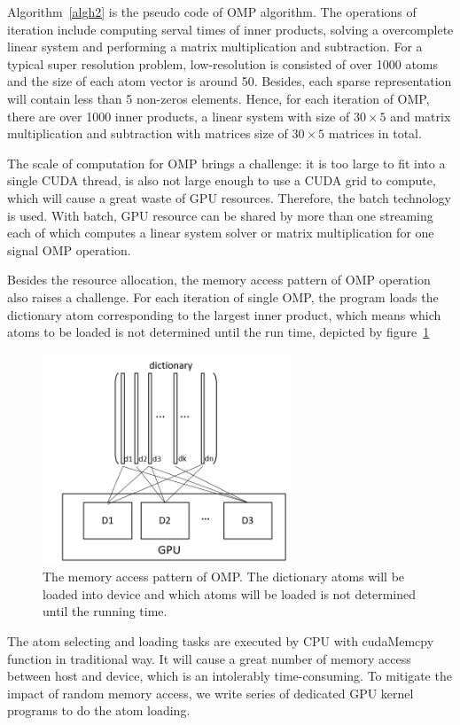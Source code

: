 \documentclass[english]{cccconf}
\begin{document}
Algorithm~\ref{algh2} is the pseudo code of OMP algorithm. The operations of iteration include computing serval times of inner products, solving a overcomplete linear system and performing a matrix multiplication and subtraction. For a typical super resolution problem, low-resolution is consisted of over 1000 atoms and the size of each atom vector is around 50. Besides, each sparse representation will contain less than 5 non-zeros elements. Hence, for each iteration of OMP, there are over 1000 inner products, a linear system with size of \(30 \times 5\) and matrix multiplication and subtraction with matrices size of \(30 \times 5\) matrices in total.

The scale of computation for OMP brings a challenge: it is too large to fit into a single CUDA thread, is also not large enough to use a CUDA grid to compute, which will cause a great waste of GPU resources. Therefore, the batch technology is used. With batch, GPU resource can be shared by more than one streaming each of which computes a linear system solver or matrix multiplication for one signal OMP operation.  

Besides the resource allocation, the memory access pattern of OMP operation also raises a challenge. For each iteration of single OMP, the program loads the dictionary atom corresponding to the largest inner product, which means which atoms to be loaded is not determined until the run time, depicted by figure~\ref{figh2}

\begin{figure}[!htb]
	\centering
	\includegraphics[width=210pt]{3.png}
	\caption{The memory access pattern of OMP. The dictionary atoms will be loaded into device and which atoms will be loaded is not determined until the running time.}
	\label{figh2}
\end{figure} 

The atom selecting and loading tasks are executed by CPU with cudaMemcpy function in traditional way. It will cause a great number of memory access between host and device, which is an intolerably time-consuming. To mitigate the impact of random memory access, we write series of dedicated GPU kernel programs to do the atom loading. 
\end{document}
